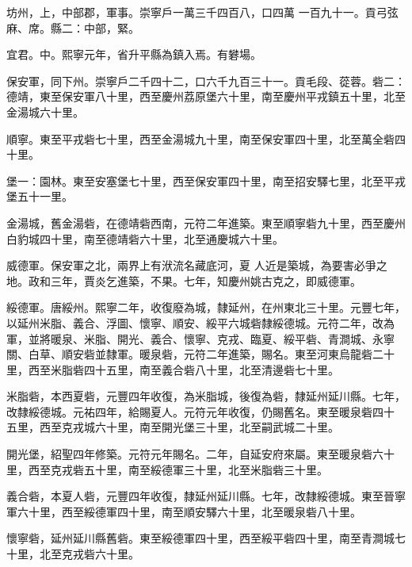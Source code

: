 \begin{pinyinscope}
 坊州，上，中部郡，軍事。崇寧戶一萬三千四百八，口四萬
 一百九十一。貢弓弦麻、席。縣二：中部，緊。



 宜君。中。熙寧元年，省升平縣為鎮入焉。有礬場。



 保安軍，同下州。崇寧戶二千四十二，口六千九百三十一。貢毛段、蓯蓉。砦二：德靖，東至保安軍八十里，西至慶州荔原堡六十里，南至慶州平戎鎮五十里，北至金湯城六十里。



 順寧。東至平戎砦七十里，西至金湯城九十里，南至保安軍四十里，北至萬全砦四十里。



 堡一：園林。東至安塞堡七十里，西至保安軍四十里，南至招安驛七里，北至平戎堡五十一里。



 金湯城，舊金湯砦，在德靖砦西南，元符二年進築。東至順寧砦九十里，西至慶州白豹城四十里，南至德靖砦六十里，北至通慶城六十里。



 威德軍。保安軍之北，兩界上有洑流名藏底河，夏
 人近是築城，為要害必爭之地。政和三年，賈炎乞進築，不果。七年，知慶州姚古克之，即威德軍。



 綏德軍。唐綏州。熙寧二年，收復廢為城，隸延州，在州東北三十里。元豐七年，以延州米脂、義合、浮圖、懷寧、順安、綏平六城砦隸綏德城。元符二年，改為軍，並將暖泉、米脂、開光、義合、懷寧、克戎、臨夏、綏平砦、青澗城、永寧關、白草、順安砦並隸軍。暖泉砦，元符二年進築，賜名。東至河東烏龍砦二十里，西至米脂砦四十五里，南至義合砦八十里，北至清邊砦七十里。



 米脂砦，本西夏砦，元豐四年收復，為米脂城，後復為砦，隸延州延川縣。七年，改隸綏德城。元祐四年，給賜夏人。元符元年收復，仍賜舊名。東至暖泉砦四十
 五里，西至克戎城六十里，南至開光堡三十里，北至嗣武城二十里。



 開光堡，紹聖四年修築。元符元年賜名。二年，自延安府來屬。東至暖泉砦六十里，西至克戎砦五十里，南至綏德軍三十里，北至米脂砦三十里。



 義合砦，本夏人砦，元豐四年收復，隸延州延川縣。七年，改隸綏德城。東至晉寧軍六十里，西至綏德軍四十里，南至順安驛六十里，北至暖泉砦八十里。



 懷寧砦，延州延川縣舊砦。東至綏德軍四十里，西至綏平砦四十里，南至青澗城七十里，北至克戎砦六十里。




\end{pinyinscope}
